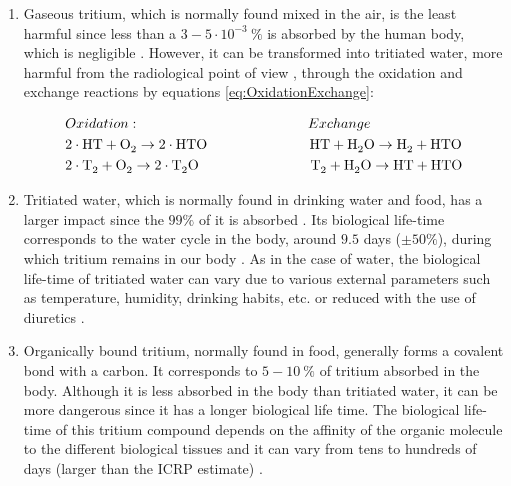 \begin{enumerate}
\item{} Gaseous tritium, which is normally found mixed in the air, is the least harmful since less than a $3-5 \cdot{} 10^{-3}~\%$ is absorbed by the human body, which is negligible \cite{TritiumHandling}. However, it can be transformed into tritiated water, more harmful from the radiological point of view \cite{TritiumHandling}, through the oxidation and exchange reactions by equations \ref{eq:OxidationExchange}:

\begin{equation}
\begin{split}
& Oxidation: \qquad \qquad \qquad \qquad \qquad \qquad Exchange\\
& 2\cdot{}\ce{HT} + \ce{O_2} \rightarrow 2 \cdot{} \ce{HTO} ~ \quad \qquad \qquad \qquad \ce{HT} + \ce{H_2 O} \rightarrow \ce{H_2} + \ce{HTO}\\
& 2\cdot{}\ce{T_2} + \ce{O_2} \rightarrow 2 \cdot{} \ce{T_2 O} \qquad \qquad \qquad \qquad \ce{T_2} + \ce{H_2 O} \rightarrow \ce{HT} + \ce{HTO}
\label{eq:OxidationExchange}
\end{split}
\end{equation}

\item{} Tritiated water, which is normally found in drinking water and food, has a larger impact since the $99\%$ of it is absorbed \cite{TritiumHandling}. Its biological life-time corresponds to the water cycle in the body, around $9.5$ days ($\pm50\%$), during which tritium remains in our body \cite{TritiumHandling, FranceTritiumEnvironment, EstimationTritiumDosi}. As in the case of water, the biological life-time of tritiated water can vary due to various external parameters such as temperature, humidity, drinking habits, etc. or reduced with the use of diuretics \cite{TritiumHandling}.

\item{} Organically bound tritium, normally found in food, generally forms a covalent bond with a carbon. It corresponds to $5-10~\%$ of tritium absorbed in the body. Although it is less absorbed in the body than tritiated water, it can be more dangerous since it has a longer biological life time. The biological life-time of this tritium compound depends on the affinity of the organic molecule to the different biological tissues and it can vary from tens to hundreds of days (larger than the ICRP estimate) \cite{FranceTritiumEnvironment, EstimationTritiumDosi, EstimationTritiumDosiRats, EstimationTritiumDosiKangarooRats}.
\end{enumerate}

